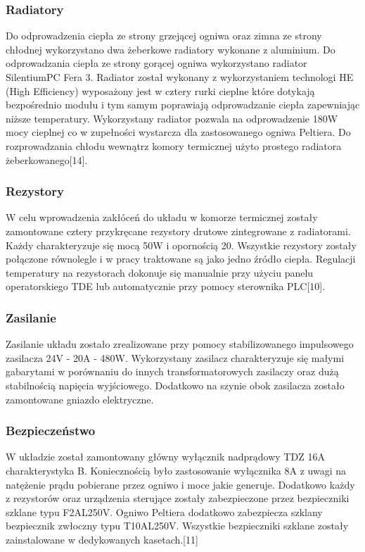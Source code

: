 \documentclass[oneside]{mgr}
\begin{document}
\subsubsection{Radiatory}
Do odprowadzenia ciepła ze strony grzejącej ogniwa oraz zimna ze strony chłodnej wykorzystano dwa żeberkowe radiatory wykonane z aluminium. Do odprowadzania ciepła ze strony gorącej ogniwa wykorzystano radiator SilentiumPC Fera 3. Radiator został wykonany z wykorzystaniem technologi HE (High Efficiency) wyposażony jest w cztery rurki cieplne które dotykają bezpośrednio modułu i tym samym poprawiają odprowadzanie ciepła zapewniając niższe temperatury. Wykorzystany radiator pozwala na odprowadzenie 180W mocy cieplnej co w zupełności wystarcza dla zastosowanego ogniwa Peltiera. Do rozprowadzania chłodu wewnątrz komory termicznej użyto prostego radiatora żeberkowanego[14]. 
\subsubsection{Rezystory}
W celu wprowadzenia zakłóceń do układu w komorze termicznej zostały zamontowane cztery przykręcane rezystory drutowe zintegrowane z radiatorami. Każdy charakteryzuje się mocą 50W i opornością 20\ohm. Wszystkie rezystory zostały połączone równolegle i w pracy traktowane są jako jedno źródło ciepła. Regulacji temperatury na rezystorach dokonuje się manualnie przy użyciu panelu operatorskiego TDE lub automatycznie przy pomocy sterownika PLC[10].
\subsubsection{Zasilanie}
Zasilanie układu zostało zrealizowane przy pomocy stabilizowanego impulsowego zasilacza 24V - 20A - 480W. Wykorzystany zasilacz charakteryzuje się małymi gabarytami w porównaniu do innych transformatorowych zasilaczy oraz  dużą stabilnością napięcia wyjściowego. Dodatkowo na szynie obok zasilacza zostało zamontowane gniazdo elektryczne.
\subsubsection{Bezpieczeństwo}
W układzie został zamontowany główny wyłącznik nadprądowy TDZ 16A charakterystyka B. Koniecznością było zastosowanie wyłącznika 8A z uwagi na natężenie prądu pobierane przez ogniwo i moce jakie generuje. Dodatkowo każdy z rezystorów oraz urządzenia sterujące zostały zabezpieczone przez  bezpieczniki szklane typu F2AL250V. Ogniwo Peltiera dodatkowo zabezpiecza szklany bezpiecznik zwłoczny typu T10AL250V. Wszystkie bezpieczniki szklane zostały zainstalowane w dedykowanych kasetach.[11]
\end{document}
